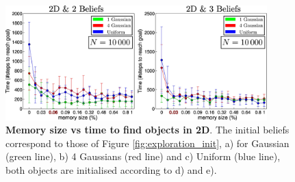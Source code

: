 \documentclass{frontiersSCNS} %
\begin{document}
\begin{figure}
  \centering
  \includegraphics[width=0.9\textwidth]{Figure15}
  \caption{\textbf{Memory size vs time to find objects in 2D}. The initial beliefs correspond 
  to those of Figure \ref{fig:exploration_init}, a) for Gaussian (green line), b) 4 Gaussians (red line)
  and c) Uniform (blue line), both objects are initialised according to d) and e).}
   \label{fig:time_to_reach_goal_2D}
\end{figure}
\end{document}
